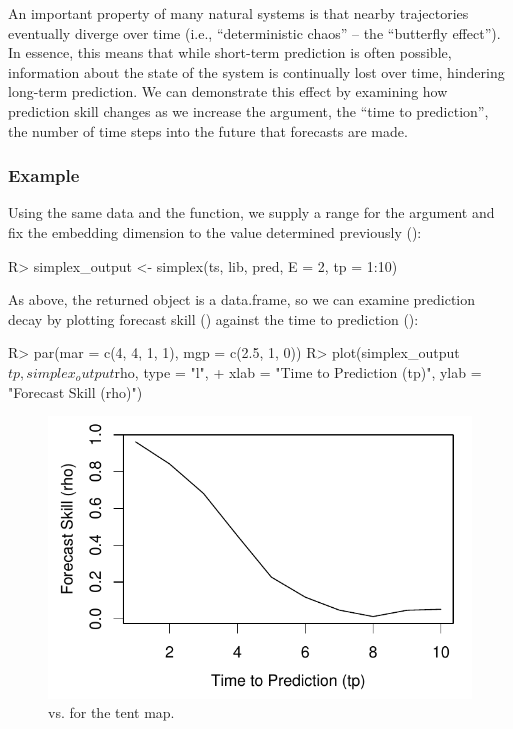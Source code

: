 \documentclass[article]{jss}
\begin{document}
An important property of many natural systems is that nearby trajectories eventually diverge over time (i.e., ``deterministic chaos'' -- the ``butterfly effect''). In essence, this means that while short-term prediction is often possible, information about the state of the system is continually lost over time, hindering long-term prediction. We can demonstrate this effect by examining how prediction skill changes as we increase the  argument, the ``time to prediction'', the number of time steps into the future that forecasts are made.

\subsubsection{Example}\label{sec:prediction-decay-example}

Using the same data and the  function, we supply a range for the  argument and fix the embedding dimension to the value determined previously ():

\begin{Schunk}
\begin{Sinput}
R> simplex_output <- simplex(ts, lib, pred, E = 2, tp = 1:10)
\end{Sinput}
\end{Schunk}

As above, the returned object is a data.frame, so we can examine prediction decay by plotting forecast skill () against the time to prediction ():

\begin{Schunk}
\begin{Sinput}
R> par(mar = c(4, 4, 1, 1), mgp = c(2.5, 1, 0))
R> plot(simplex_output$tp, simplex_output$rho, type = "l",
+       xlab = "Time to Prediction (tp)", ylab = "Forecast Skill (rho)")
\end{Sinput}
\end{Schunk}

\begin{figure}[t!]
\centering
\includegraphics[width=4.5in]{article-simplex-tp}
\caption{\label{fig:simplex-tp}  vs.  for the tent map.}
\end{figure}
\end{document}

